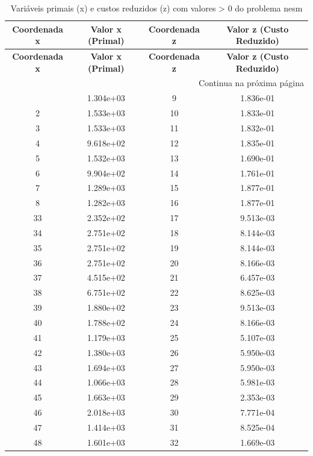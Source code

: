\documentclass[12pt]{article}
\begin{document}
\begin{longtable}{@{}cccc@{}}
\caption{Variáveis primais (x) e custos reduzidos (z) com valores > 0 do problema nesm} \\
\toprule
\textbf{Coordenada x} & \textbf{Valor x (Primal)} & \textbf{Coordenada z} & \textbf{Valor z (Custo Reduzido)} \\
\midrule
\endfirsthead

\toprule
\textbf{Coordenada x} & \textbf{Valor x (Primal)} & \textbf{Coordenada z} & \textbf{Valor z (Custo Reduzido)} \\
\midrule
\endhead

\midrule \multicolumn{4}{r}{{Continua na próxima página}} \\ \midrule
\endfoot

\bottomrule
\endlastfoot
1 & 1.304e+03 & 9 & 1.836e-01 \\
2 & 1.533e+03 & 10 & 1.833e-01 \\
3 & 1.533e+03 & 11 & 1.832e-01 \\
4 & 9.618e+02 & 12 & 1.835e-01 \\
5 & 1.532e+03 & 13 & 1.690e-01 \\
6 & 9.904e+02 & 14 & 1.761e-01 \\
7 & 1.289e+03 & 15 & 1.877e-01 \\
8 & 1.282e+03 & 16 & 1.877e-01 \\
33 & 2.352e+02 & 17 & 9.513e-03 \\
34 & 2.751e+02 & 18 & 8.144e-03 \\
35 & 2.751e+02 & 19 & 8.144e-03 \\
36 & 2.751e+02 & 20 & 8.166e-03 \\
37 & 4.515e+02 & 21 & 6.457e-03 \\
38 & 6.751e+02 & 22 & 8.625e-03 \\
39 & 1.880e+02 & 23 & 9.513e-03 \\
40 & 1.788e+02 & 24 & 8.166e-03 \\
41 & 1.179e+03 & 25 & 5.107e-03 \\
42 & 1.380e+03 & 26 & 5.950e-03 \\
43 & 1.694e+03 & 27 & 5.950e-03 \\
44 & 1.066e+03 & 28 & 5.981e-03 \\
45 & 1.663e+03 & 29 & 2.353e-03 \\
46 & 2.018e+03 & 30 & 7.771e-04 \\
47 & 1.414e+03 & 31 & 8.525e-04 \\
48 & 1.601e+03 & 32 & 1.669e-03 \\

\end{longtable}
\end{document}
